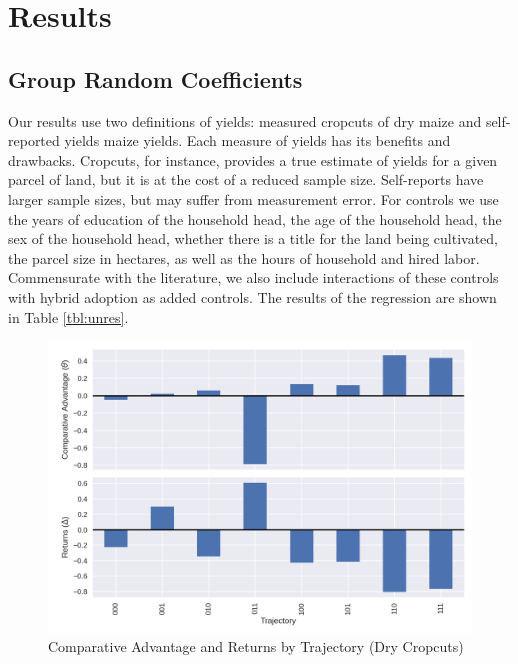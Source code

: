 \documentclass{article}
\begin{document}
\section{Results}

\subsection{Group Random Coefficients}

Our results use two definitions of yields: measured cropcuts of dry maize and self-reported yields maize yields. Each measure of yields has its benefits and drawbacks. Cropcuts, for instance, provides a true estimate of yields for a given parcel of land, but it is at the cost of a reduced sample size. Self-reports have larger sample sizes, but may suffer from measurement error. For controls we use the years of education of the household head, the age of the household head, the sex of the household head, whether there is a title for the land being cultivated, the parcel size in hectares, as well as the hours of household and hired labor. Commensurate with the literature, we also include interactions of these controls with hybrid adoption as added controls. The results of the regression are shown in Table \ref{tbl:unres}.

\resizebox{1\textwidth}{!}{

}

\resizebox{1\textwidth}{!}{
\centering
% 


}
% 

\begin{figure}
    \centering
    \includegraphics[scale=0.75]{results/figures/theta.png}
    \caption{Comparative Advantage and Returns by Trajectory (Dry Cropcuts)}
    \label{fig:theta_delta_raw}
\end{figure}
\end{document}
